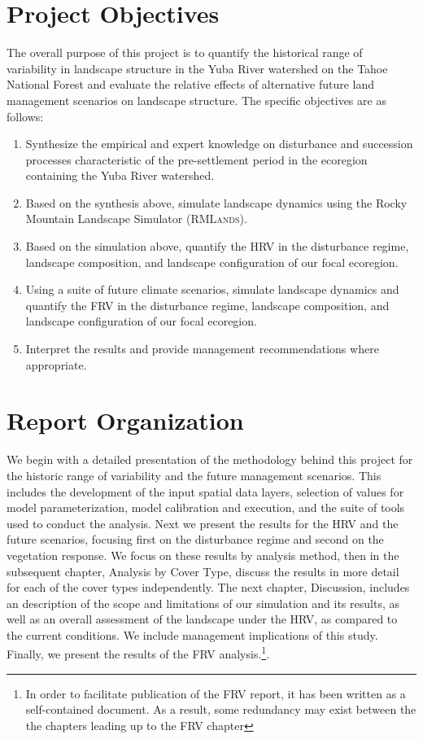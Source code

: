 \section{Project Objectives}
The overall purpose of this project is to quantify the historical range of variability in landscape structure in the Yuba River watershed on the Tahoe National Forest and evaluate the relative effects of  alternative future land management scenarios on landscape structure. The specific objectives are as follows:
\begin{enumerate}
	\item Synthesize the empirical and expert knowledge on disturbance and succession processes characteristic of the pre-settlement period in the ecoregion containing the Yuba River watershed.
	\item Based on the synthesis above, simulate landscape dynamics using the Rocky Mountain Landscape Simulator (\textsc{RMLands}).
	\item Based on the simulation above, quantify the HRV in the disturbance regime, landscape composition, and landscape configuration of our focal ecoregion.
	\item Using a suite of future climate scenarios, simulate landscape dynamics and quantify the FRV in the disturbance regime, landscape composition, and landscape configuration of our focal ecoregion.
	\item Interpret the results and provide management recommendations where appropriate.
\end{enumerate}


\section{Report Organization}

We begin with a detailed presentation of the methodology behind this project for the historic range of variability and the future management scenarios. This includes the development of the input spatial data layers, selection of values for model parameterization, model calibration and execution, and the suite of tools used to conduct the analysis. Next we present the results for the HRV and the future scenarios, focusing first on the disturbance regime and second on the vegetation response. We focus on these results by analysis method, then in the subsequent chapter, Analysis by Cover Type, discuss the results in more detail for each of the cover types independently. The next chapter, Discussion, includes an description of the scope and limitations of our simulation and its results, as well as an overall assessment of the landscape under the HRV, as compared to the current conditions. We include management implications of this study. Finally, we present the results of the FRV analysis.\footnote{In order to facilitate publication of the FRV report, it has been written as a self-contained document. As a result, some redundancy may exist between the the chapters leading up to the FRV chapter}.
